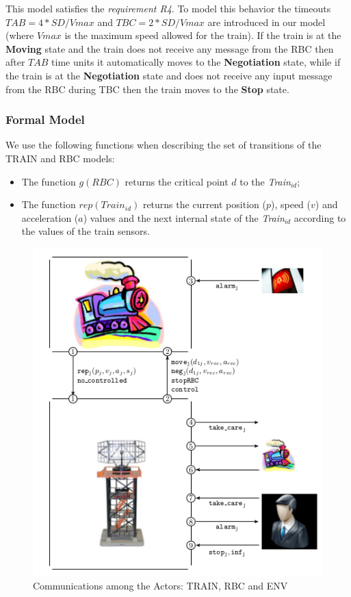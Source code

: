 \documentclass{template/openetcs_article}
\begin{document}
This model satisfies the \textit{requirement R4}.	
To model this behavior the timeouts $TAB = 4*SD/Vmax$ and $TBC = 2*SD/Vmax$ are introduced in our model (where $Vmax$ is the maximum speed allowed for the train). If the train is at the \textbf{Moving} state and the train does not receive any message from the RBC then after $TAB$ time units it automatically moves to the \textbf{Negotiation} state, while if the train is at the \textbf{Negotiation} state and does not receive any input message from the RBC during TBC then the train moves to the \textbf{Stop} state.


\subsubsection{Formal Model}

We use the following functions when describing the set of transitions of the TRAIN and RBC models:

\begin{itemize}
\item The function $g(RBC)$ returns the critical point $d$ to the \textit{Train$_{id}$};
\item The function $rep(Train_{id})$ returns the current position ($p$), speed ($v$) and acceleration ($a$) values and the next internal state of the \textit{Train$_{id}$} according to the values of the train sensors.
\end{itemize}

\begin{figure}[!htbp]
\begin{center}
  \includegraphics[width=.6\textwidth]{figures/ETCSModel.png}
  \caption{Communications among the Actors: TRAIN, RBC and ENV}
  \label{fig:model}
\end{center}
\end{figure}
\end{document}

